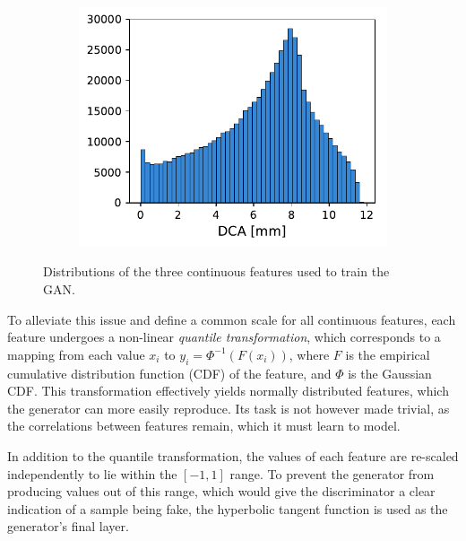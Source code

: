 \begin{figure}
{\begin{subfigure}[t]{0.35\textwidth}
        \end{subfigure}
        \begin{subfigure}[t]{0.35\textwidth}
            \centering
            \hspace{-0.5cm}
            \includegraphics[width=\textwidth]{chapter4/real_doca.pdf}
        \end{subfigure}}
    \caption{Distributions of the three continuous features used to train the GAN.}
    \label{fig:original_feature_distributions}
\end{figure}

To alleviate this issue and define a common scale for all continuous features,
each feature undergoes a non-linear \emph{quantile transformation}, which
corresponds to a mapping from each value $x_i$ to $y_i = \Phi^{-1}(F(x_i))$,
where $F$ is the empirical cumulative distribution function (CDF) of the
feature, and $\Phi$ is the Gaussian CDF. This transformation effectively yields
normally distributed features, which the generator can more easily reproduce.
Its task is not however made trivial, as the correlations between features
remain, which it must learn to model.

In addition to the quantile transformation, the values of each feature are
re-scaled independently to lie within the $[-1, 1]$ range. To prevent the
generator from producing values out of this range, which would give the
discriminator a clear indication of a sample being fake, the hyperbolic tangent
function is used as the generator's final layer.

